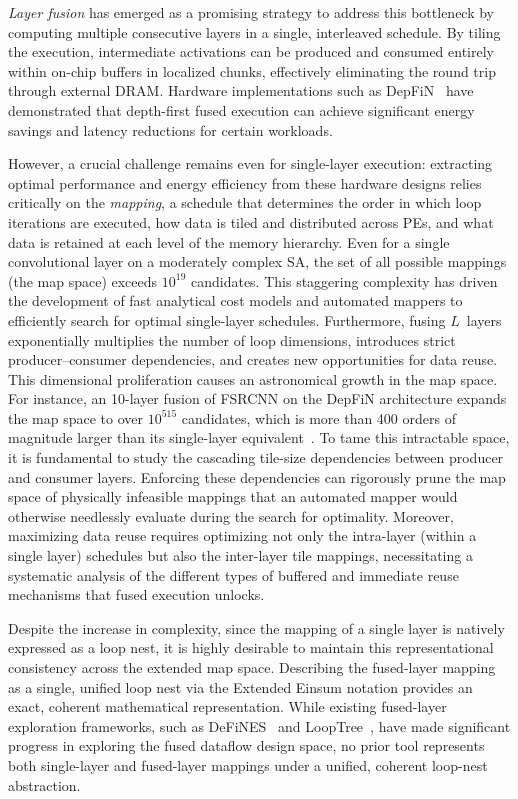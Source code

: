 \emph{Layer fusion} has emerged as a promising strategy to address this
bottleneck by computing multiple consecutive layers in a single, interleaved
schedule. By tiling the execution, intermediate activations
can be produced and consumed entirely within on-chip buffers in localized
chunks, effectively eliminating the round trip through external DRAM.
Hardware implementations such as DepFiN~\cite{goetschalckx2023depfin}
have demonstrated that depth-first fused execution can achieve
significant energy savings and latency reductions for certain workloads.

However, a crucial challenge remains even for single-layer execution: extracting optimal performance and energy efficiency from these hardware designs relies critically on the \emph{mapping}, a schedule that determines the order in which loop iterations are executed, how data is tiled and distributed across PEs, and what data is retained at each level of the memory hierarchy. Even for a single convolutional layer on a moderately complex SA, the set of all possible mappings (the map space) exceeds $10^{19}$ candidates. This staggering complexity has driven the development of fast analytical cost models and automated mappers to efficiently search for optimal single-layer schedules.
Furthermore, fusing $L$~layers exponentially multiplies the number of loop dimensions, introduces strict producer--consumer dependencies, and creates new opportunities for data reuse. This dimensional proliferation causes an astronomical growth in the map space.  For instance, an 10-layer fusion of FSRCNN on the DepFiN architecture expands the map space to over $10^{515}$ candidates, which is more than 400 orders of magnitude larger than its single-layer equivalent~\cite{Factorflow}. To tame this intractable space, it is fundamental to study the cascading tile-size dependencies between producer and consumer layers. Enforcing these dependencies can rigorously prune the map space of physically infeasible mappings that an automated mapper would otherwise needlessly evaluate during the search for optimality. Moreover, maximizing data reuse requires optimizing not only the intra-layer (within a single layer) schedules but also the inter-layer tile mappings, necessitating a systematic analysis of the different types of buffered and immediate reuse mechanisms that fused execution unlocks.

Despite the increase in complexity, since the mapping of a single layer is natively expressed as a loop nest, it is highly desirable to maintain this representational consistency across the extended map space. Describing the fused-layer mapping as a single, unified loop nest via the Extended Einsum notation provides an exact, coherent mathematical representation. While existing fused-layer exploration frameworks, such as DeFiNES~\cite{mei2023defines} and LoopTree~\cite{gilbert2024looptree}, have made significant progress in exploring the fused dataflow design space, no prior tool represents both single-layer and fused-layer mappings under a unified, coherent loop-nest abstraction.


